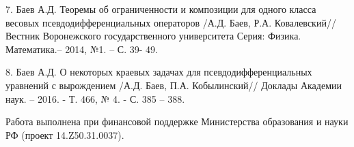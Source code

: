 {7. Баев А.Д. Теоремы об ограниченности и композиции для одного класса
весовых псевдодифференциальных операторов /А.Д. Баев, Р.А. Ковалевский//
Вестник Воронежского государственного университета Серия: Физика.
Математика.-- 2014, №1. -- С. 39- 49.

8. Баев А.Д. О некоторых краевых задачах для псевдодифференциальных
уравнений с вырождением /А.Д. Баев, П.А. Кобылинский// Доклады Академии
наук. -- 2016. - Т. 466, № 4. - С. 385 -- 388.





Работа выполнена при финансовой поддержке Министерства образования и науки
РФ (проект 14.Z50.31.0037).

}
